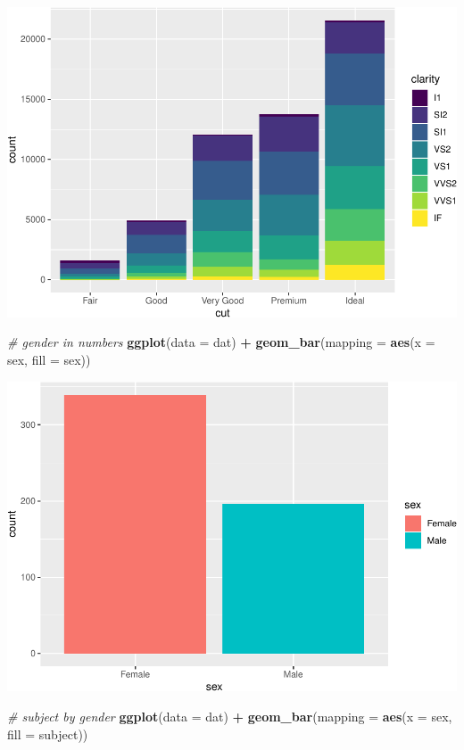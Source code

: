 \documentclass[]{article}
\newenvironment{Shaded}{\begin{snugshade}}{\end{snugshade}}
\newcommand{\CommentTok}[1]{\textcolor[rgb]{0.56,0.35,0.01}{\textit{#1}}}
\newcommand{\DataTypeTok}[1]{\textcolor[rgb]{0.13,0.29,0.53}{#1}}
\newcommand{\KeywordTok}[1]{\textcolor[rgb]{0.13,0.29,0.53}{\textbf{#1}}}
\newcommand{\NormalTok}[1]{#1}
\newcommand{\OperatorTok}[1]{\textcolor[rgb]{0.81,0.36,0.00}{\textbf{#1}}}
\newcommand{\StringTok}[1]{\textcolor[rgb]{0.31,0.60,0.02}{#1}}
\begin{document}
\includegraphics{StudentGoals_files/figure-latex/unnamed-chunk-11-2.pdf}

\begin{Shaded}
\begin{Highlighting}[]
\CommentTok{# gender in numbers}
\KeywordTok{ggplot}\NormalTok{(}\DataTypeTok{data =}\NormalTok{ dat) }\OperatorTok{+}\StringTok{ }
\StringTok{  }\KeywordTok{geom_bar}\NormalTok{(}\DataTypeTok{mapping =} \KeywordTok{aes}\NormalTok{(}\DataTypeTok{x =}\NormalTok{ sex, }\DataTypeTok{fill =}\NormalTok{ sex))}
\end{Highlighting}
\end{Shaded}

\includegraphics{StudentGoals_files/figure-latex/unnamed-chunk-11-3.pdf}

\begin{Shaded}
\begin{Highlighting}[]
\CommentTok{# subject by gender}
\KeywordTok{ggplot}\NormalTok{(}\DataTypeTok{data =}\NormalTok{ dat) }\OperatorTok{+}\StringTok{ }
\StringTok{  }\KeywordTok{geom_bar}\NormalTok{(}\DataTypeTok{mapping =} \KeywordTok{aes}\NormalTok{(}\DataTypeTok{x =}\NormalTok{ sex, }\DataTypeTok{fill =}\NormalTok{ subject))}
\end{Highlighting}
\end{Shaded}
\end{document}
